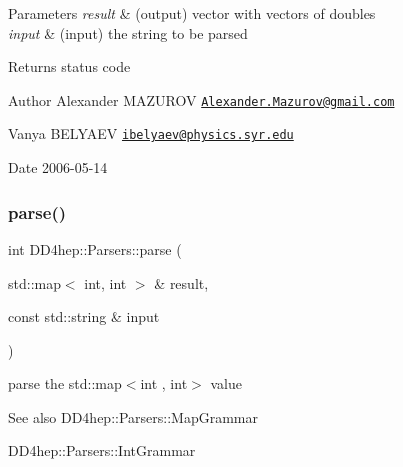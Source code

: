 \begin{DoxyParams}{Parameters}
{\em result} & (output) vector with vectors of doubles \\
\hline
{\em input} & (input) the string to be parsed \\
\hline
\end{DoxyParams}
\begin{DoxyReturn}{Returns}
status code
\end{DoxyReturn}
\begin{DoxyAuthor}{Author}
Alexander M\+A\+Z\+U\+R\+OV \href{mailto:Alexander.Mazurov@gmail.com}{\tt Alexander.\+Mazurov@gmail.\+com} 

Vanya B\+E\+L\+Y\+A\+EV \href{mailto:ibelyaev@physics.syr.edu}{\tt ibelyaev@physics.\+syr.\+edu} 
\end{DoxyAuthor}
\begin{DoxyDate}{Date}
2006-\/05-\/14 
\end{DoxyDate}
\hypertarget{namespace_d_d4hep_1_1_parsers_ac82777050fc05e43dcd2e5fa4648cfb5}{}\label{namespace_d_d4hep_1_1_parsers_ac82777050fc05e43dcd2e5fa4648cfb5} 
\subsubsection{\texorpdfstring{parse()}{parse()}\hspace{0.1cm}{\footnotesize\ttfamily [6/21]}}
{\footnotesize\ttfamily int D\+D4hep\+::\+Parsers\+::parse (\begin{DoxyParamCaption}\item[{std\+::map$<$ int, int $>$ \&}]{result,  }\item[{const std\+::string \&}]{input }\end{DoxyParamCaption})}



parse the {\ttfamily std\+::map$<$int , int$>$} value 

\begin{DoxySeeAlso}{See also}
D\+D4hep\+::\+Parsers\+::\+Map\+Grammar 

D\+D4hep\+::\+Parsers\+::\+Int\+Grammar 
\end{DoxySeeAlso}

